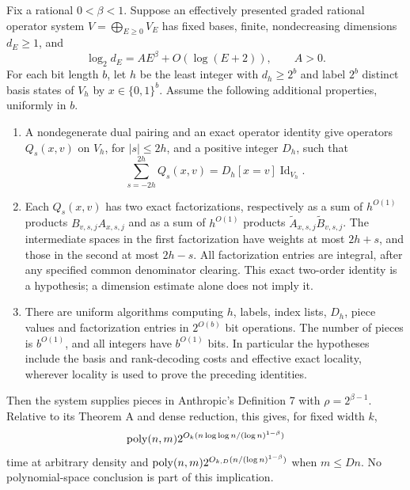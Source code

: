 \begin{proposition}
\label{prop:graded-growth}
Fix a rational $0<\beta<1$.  Suppose an effectively presented graded rational
operator system $V=\bigoplus_{E\ge0}V_E$ has fixed bases, finite,
nondecreasing dimensions $d_E\ge1$, and
\begin{equation}
 \log_2d_E=A E^\beta+O(\log(E+2)),\qquad A>0.
 \label{eq:graded-growth}
\end{equation}
For each bit length $b$, let $h$ be the least integer with $d_h\ge2^b$
and label $2^b$ distinct basis states of $V_h$ by $x\in\{0,1\}^b$.
Assume the following additional properties, uniformly in $b$.
\begin{enumerate}
\item A nondegenerate dual pairing and an exact operator identity give
operators $Q_s(x,v)$ on $V_h$, for $|s|\le2h$, and a positive integer
$D_h$, such that
\[
 \sum_{s=-2h}^{2h}Q_s(x,v)=D_h[x=v]\operatorname{Id}_{V_h}.
\]
\item Each $Q_s(x,v)$ has two exact factorizations, respectively as a
sum of $h^{O(1)}$ products $B_{v,s,j}A_{x,s,j}$ and as a sum of
$h^{O(1)}$ products $\widetilde A_{x,s,j}\widetilde B_{v,s,j}$.
The intermediate spaces in the first factorization have weights at
most $2h+s$, and those in the second at most $2h-s$.
All factorization entries are integral, after any specified common
denominator clearing.  This exact two-order identity is a hypothesis;
a dimension estimate alone does not imply it.
\item There are uniform algorithms computing $h$, labels, index lists,
$D_h$, piece values and factorization entries in $2^{O(b)}$ bit
operations.  The number of pieces is $b^{O(1)}$, and all integers have
$b^{O(1)}$ bits.  In particular the hypotheses include the basis and
rank-decoding costs and effective exact locality, wherever locality is
used to prove the preceding identities.
\end{enumerate}
Then the system supplies pieces in Anthropic's Definition 7 with
$\rho=2^{\beta-1}$.  Relative to its Theorem A and dense reduction, this
gives, for fixed width $k$,
\[
 \operatorname{poly}(n,m)2^{O_k(n\log\log n/(\log n)^{1-\beta})}
\]
time at arbitrary density and
$\operatorname{poly}(n,m)2^{O_{k,D}(n/(\log n)^{1-\beta})}$ when $m\le Dn$.
No polynomial-space conclusion is part of this implication.
\end{proposition}

